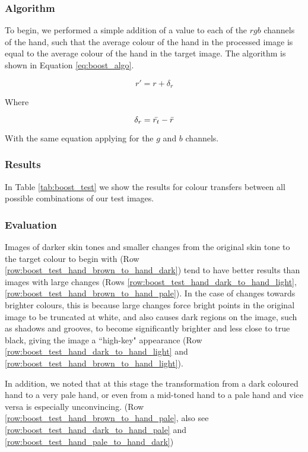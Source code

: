 \subsubsection*{Algorithm}
To begin, we performed a simple addition of a value to each of the $rgb$ channels of the hand, such that the average colour of the hand in the processed image is equal to the average colour of the hand in the target image. The algorithm is shown in Equation \ref{eq:boost_algo}.

\begin{equation} \label{eq:boost_algo}
r' = r + \delta_r
\end{equation}

Where 

\begin{equation*}
\delta_r = \bar{r_t} - \bar{r}
\end{equation*}


With the same equation applying for the $g$ and $b$ channels.

\subsubsection*{Results}
In Table \ref{tab:boost_test} we show the results for colour transfers between all possible combinations of our test images.


\subsubsection*{Evaluation}
Images of darker skin tones and smaller changes from the original skin tone to the target colour to begin with (Row \ref{row:boost_test_hand_brown_to_hand_dark}) tend to have better results than images with large changes (Rows \ref{row:boost_test_hand_dark_to_hand_light}, \ref{row:boost_test_hand_brown_to_hand_pale}). In the case of changes towards brighter colours, this is because large changes force bright points in the original image to be truncated at white, and also causes dark regions on the image, such as shadows and grooves, to become significantly brighter and less close to true black, giving the image a ``high-key" appearance (Row \ref{row:boost_test_hand_dark_to_hand_light} and \ref{row:boost_test_hand_brown_to_hand_light}).

In addition, we noted that at this stage the transformation from a dark coloured hand to a very pale hand, or even from a mid-toned hand to a pale hand and vice versa is especially unconvincing. (Row \ref{row:boost_test_hand_brown_to_hand_pale}, also see \ref{row:boost_test_hand_dark_to_hand_pale} and \ref{row:boost_test_hand_pale_to_hand_dark})
